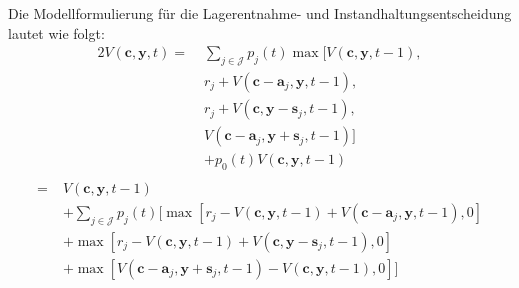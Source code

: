 Die Modellformulierung für die Lagerentnahme- und Instandhaltungsentscheidung lautet wie folgt:
\begin{alignat*}{2}
V(\textbf{c}, \textbf{y}, t) =\;& \sum_{j \in \mathcal{J}}p_{j}(t)\max[V(\textbf{c}, \textbf{y}, t-1),\\
&r_{j} + V(\textbf{c}-\textbf{a}_j, \textbf{y}, t-1),\\
&r_{j} + V(\textbf{c}, \textbf{y}-\textbf{s}_j, t-1),\\
&V(\textbf{c}-\textbf{a}_j, \textbf{y}+\textbf{s}_j, t-1)]\\
&+ p_{0}(t)V(\textbf{c}, \textbf{y}, t-1) \\
\end{alignat*}
\begin{equation}\label{storage}
\begin{alignat*}{2}
= \;& V(\textbf{c}, \textbf{y}, t-1)\\
&+ \sum_{j \in \mathcal{J}}p_{j}(t)[\max[r_{j} - V(\textbf{c}, \textbf{y}, t-1) + V(\textbf{c}-\textbf{a}_j, \textbf{y}, t-1),0] \\
&+ \max[r_{j} - V(\textbf{c}, \textbf{y}, t-1) + V(\textbf{c}, \textbf{y}-\textbf{s}_j, t-1),0]\\
&+ \max[V(\textbf{c}-\textbf{a}_j, \textbf{y}+\textbf{s}_j, t-1) - V(\textbf{c}, \textbf{y}, t-1) ,0]]\\
\end{alignat*}
\end{equation}

